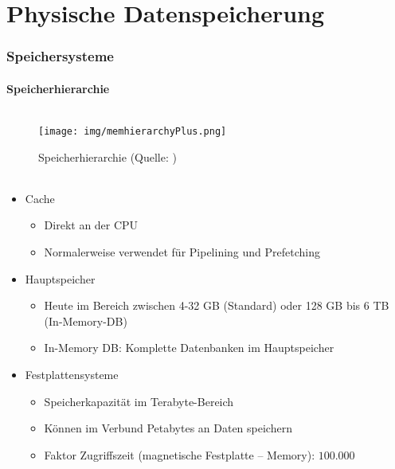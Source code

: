 \part{Physische Datenspeicherung}
\section{Speichersysteme}

\subsection{Speicherhierarchie}

\begin{frame}
	\frametitle{\insertsection}
	\framesubtitle{\insertsubsection}
	\begin{figure}
		\texttt{[image: img/memhierarchyPlus.png]}
		\caption{Speicherhierarchie (Quelle: \cite[S. 432]{SKS11})}
	\end{figure}
\end{frame}

\begin{frame}
	\frametitle{\insertsection}
	\framesubtitle{\insertsubsection}
    \begin{itemize}
        \item Cache
        \begin{itemize}
            \item Direkt an der CPU
            \item Normalerweise verwendet für Pipelining und Prefetching
        \end{itemize}
        \pause
        \item Hauptspeicher
        \begin{itemize}
            \item Heute im Bereich zwischen 4-32 GB (Standard) oder 128 GB bis 6 TB (In-Memory-DB)
            \item In-Memory DB: Komplette Datenbanken im Hauptspeicher
        \end{itemize}
        \pause
        \item Festplattensysteme 
        \begin{itemize}
            \item Speicherkapazität im Terabyte-Bereich
            \item Können im Verbund Petabytes an Daten speichern
            \item Faktor Zugriffszeit (magnetische Festplatte -- Memory): $100.000$
        \end{itemize}
    \end{itemize}
\end{frame}

